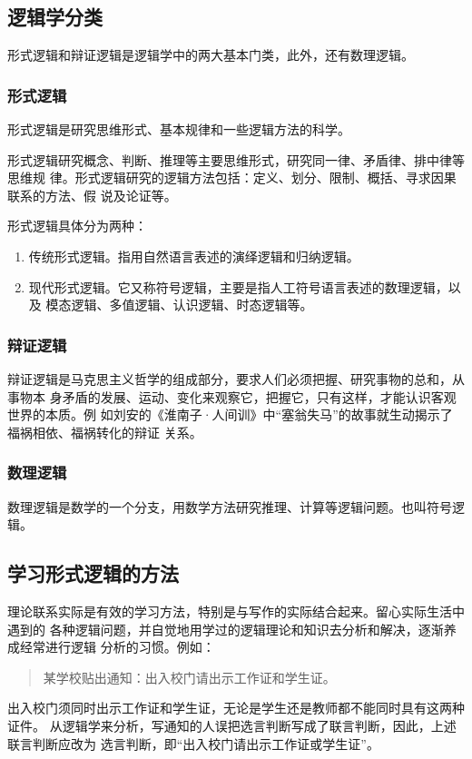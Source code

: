 \documentclass[final,oneside]{ctexbook}
\newenvironment{equotation}{\begin{quotation}\kaishu}{\end{quotation}}
\begin{document}
\subsection{逻辑学分类}

形式逻辑和辩证逻辑是逻辑学中的两大基本门类，此外，还有数理逻辑。

\subsubsection{形式逻辑}

形式逻辑是研究思维形式、基本规律和一些逻辑方法的科学。

形式逻辑研究概念、判断、推理等主要思维形式，研究同一律、矛盾律、排中律等思维规
律。形式逻辑研究的逻辑方法包括：定义、划分、限制、概括、寻求因果联系的方法、假
说及论证等。

形式逻辑具体分为两种：
\begin{enumerate}
  \item 传统形式逻辑。指用自然语言表述的演绎逻辑和归纳逻辑。

  \item 现代形式逻辑。它又称符号逻辑，主要是指人工符号语言表述的数理逻辑，以及
    模态逻辑、多值逻辑、认识逻辑、时态逻辑等。
\end{enumerate}

\subsubsection{辩证逻辑}

辩证逻辑是马克思主义哲学的组成部分，要求人们必须把握、研究事物的总和，从事物本
身矛盾的发展、运动、变化来观察它，把握它，只有这样，才能认识客观世界的本质。例
如刘安的《淮南子·人间训》中“塞翁失马”的故事就生动揭示了福祸相依、福祸转化的辩证
关系。

\subsubsection{数理逻辑}

数理逻辑是数学的一个分支，用数学方法研究推理、计算等逻辑问题。也叫符号逻辑。

\subsection{学习形式逻辑的方法}

理论联系实际是有效的学习方法，特别是与写作的实际结合起来。留心实际生活中遇到的
各种逻辑问题，并自觉地用学过的逻辑理论和知识去分析和解决，逐渐养成经常进行逻辑
分析的习惯。例如：
\begin{equotation}
  某学校贴出通知：出入校门请出示工作证和学生证。
\end{equotation}
出入校门须同时出示工作证和学生证，无论是学生还是教师都不能同时具有这两种证件。
从逻辑学来分析，写通知的人误把选言判断写成了联言判断，因此，上述联言判断应改为
选言判断，即“出入校门请出示工作证或学生证”。
\end{document}
